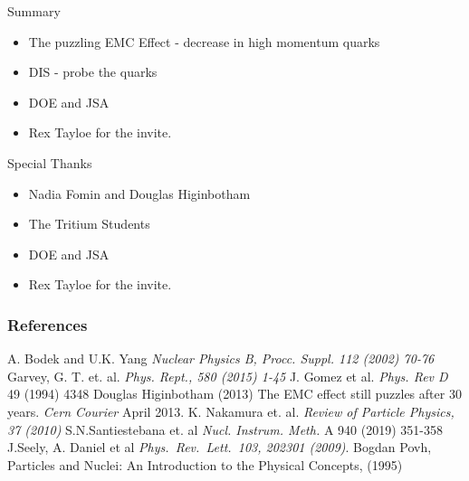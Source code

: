 \documentclass[12pt]{beamer}
\begin{document}
\begin{frame}{}
\begin{block}{Summary}
	\begin{itemize}
		\item The puzzling EMC Effect - decrease in high momentum quarks
		\item DIS - probe the quarks 
		\item DOE and JSA 
		\item Rex Tayloe for the invite.
	\end{itemize}
\end{block}


\begin{block}{Special Thanks}
	\begin{itemize}
		\item Nadia Fomin and Douglas Higinbotham
		\item The Tritium Students 
		\item DOE and JSA 
		\item Rex Tayloe for the invite.
	\end{itemize}
\end{block}
\end{frame}


\begin{frame}[allowframebreaks]
\vspace*{-3pt}
\frametitle{References}
\footnotesize{
	\begin{thebibliography}{9} %
		\vspace*{-20pt}
		 A. Bodek and U.K. Yang
		\newblock \emph{Nuclear Physics B, Procc. Suppl. 112 (2002) 70-76 }			
\vspace*{-8pt}
		 Garvey, G. T. et. al.
		\newblock \emph{Phys. Rept., 580 (2015) 1-45 }	
\vspace*{-8pt}		
		 J. Gomez et al.   
		\newblock \emph{Phys. Rev D}  49 (1994) 4348 
\vspace*{-8pt}
		 Douglas Higinbotham (2013) 
		\newblock The EMC effect still puzzles after 30 years. \emph{Cern Courier} April 2013.
\vspace*{-8pt}		
		 K. Nakamura et. al.
		\newblock \emph{Review of Particle Physics, 37 (2010) }	
\vspace*{-8pt}		
		 S.N.Santiestebana et. al 
		\newblock 	\emph{Nucl. Instrum. Meth.} A 940 (2019) 351-358
\vspace*{-8pt}				
		 J.Seely, A. Daniel et al  
		\newblock \emph{Phys.\ Rev.\ Lett.\   103, 202301 (2009)}.
\vspace*{-8pt}				
		 Bogdan Povh,
		\newblock Particles and Nuclei: An Introduction to the Physical Concepts, (1995)
	
		
	\end{thebibliography}
}
\end{frame}
\end{document}

